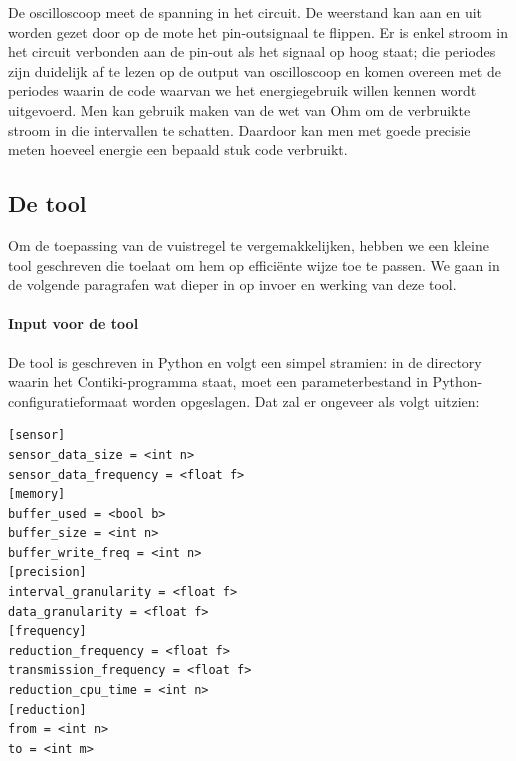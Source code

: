 \documentclass[11pt]{article}
\begin{document}
De oscilloscoop meet de spanning in het circuit. De weerstand kan aan en uit
worden gezet door op de mote het pin-outsignaal te flippen. Er is enkel stroom
in het circuit verbonden aan de pin-out als het signaal op hoog staat; die
periodes zijn duidelijk af te lezen op de output van oscilloscoop en komen
overeen met de periodes waarin de code waarvan we het energiegebruik willen
kennen wordt uitgevoerd. Men kan gebruik maken van de wet van Ohm om de
verbruikte stroom in die intervallen te schatten. Daardoor kan men met goede
precisie meten hoeveel energie een bepaald stuk code verbruikt.

\subsection{De tool}

Om de toepassing van de vuistregel te vergemakkelijken, hebben we een kleine
tool geschreven die toelaat om hem op effici\"ente wijze toe te passen. We gaan
in de volgende paragrafen wat dieper in op invoer en werking van deze tool.

\paragraph{Input voor de tool}
De tool is geschreven in Python en volgt een simpel stramien: in de directory
waarin het Contiki-programma staat, moet een parameterbestand in
Python-configuratieformaat worden opgeslagen. Dat zal er ongeveer als volgt
uitzien:

\begin{verbatim}
[sensor]
sensor_data_size = <int n>
sensor_data_frequency = <float f>
[memory]
buffer_used = <bool b>
buffer_size = <int n>
buffer_write_freq = <int n>
[precision]
interval_granularity = <float f>
data_granularity = <float f>
[frequency]
reduction_frequency = <float f>
transmission_frequency = <float f>
reduction_cpu_time = <int n>
[reduction]
from = <int n>
to = <int m>
\end{verbatim}
\end{document}
